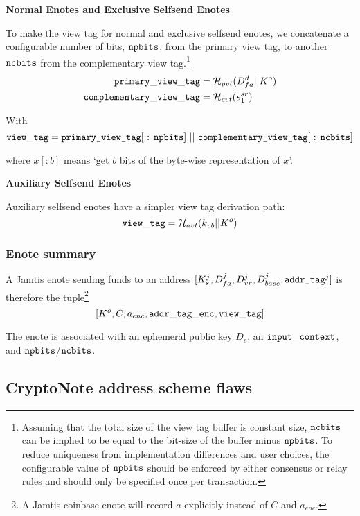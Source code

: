 \textbf{Normal Enotes and Exclusive Selfsend Enotes}

To make the view tag for normal and exclusive selfsend enotes, we concatenate a configurable number of bits, ${\tt npbits}$, from the primary view tag, to another ${\tt ncbits}$ from the complementary view tag.\footnote{Assuming that the total size of the view tag buffer is constant size, ${\tt ncbits}$ can be implied to be equal to the bit-size of the buffer minus ${\tt npbits}$. To reduce uniqueness from implementation differences and user choices, the configurable value of ${\tt npbits}$ should be enforced by either consensus or relay rules and should only be specified once per transaction.}
\begin{align*}
    {\tt primary\_view\_tag} &= \mathcal{H}_{pvt}(D^d_{fa} || K^o) \\
    {\tt complementary\_view\_tag} &= \mathcal{H}_{cvt}(s^{sr}_1)
\end{align*}

With
\[ {\tt view\_tag} = \textrm{{\tt primary\_view\_tag}[ : {\tt npbits}] } || \textrm{ {\tt complementary\_view\_tag}[ : {\tt ncbits}]} \]

where $x[:{b}]$ means `get $b$ bits of the byte-wise representation of $x$'.

\textbf{Auxiliary Selfsend Enotes}

Auxiliary selfsend enotes have a simpler view tag derivation path:\vspace{.115cm}
\[ {\tt view\_tag} = \mathcal{H}_{avt}(k_{vb} || K^o) \]

\subsubsection{Enote summary}
\label{subsubsec:jamtis-enote-construction-view-tag}

A Jamtis enote sending funds to an address $[K^j_s, D^j_{fa}, D^j_{vr}, D^j_{base}, \textrm{\tt addr\_tag}^j]$ is therefore the tuple\footnote{A Jamtis coinbase enote will record $a$ explicitly instead of $C$ and $a_{enc}$.}\vspace{.115cm}
\[ [K^o, C, a_{enc}, {\tt addr\_tag\_enc}, {\tt view\_tag}] \]

The enote is associated with an ephemeral public key $D_e$, an ${\tt input\_context}$, and ${\tt npbits}$/${\tt ncbits}$.


\subsection{CryptoNote address scheme flaws}
\label{subsec:jamtis-cryptonote-address-scheme-flaws}

